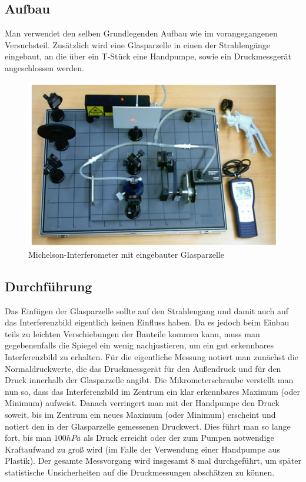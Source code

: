 \documentclass[a4paper, 11pt]{article}
\begin{document}
\subsection{Aufbau}
Man verwendet den selben Grundlegenden Aufbau wie im vorangegangenen Versuchsteil. Zusätzlich wird eine Glasparzelle in einen der Strahlengänge eingebaut, an die über ein T-Stück eine Handpumpe, sowie ein Druckmessgerät angeschlossen werden.

\begin{figure}[H]
	\centering
	\includegraphics[scale=0.5]{./Bilder/Aufbau_Bild_Luft.png}
	\caption{Michelson-Interferometer mit eingebauter Glasparzelle}
	\label{pic:Aufbau_Bild_Luft}	
\end{figure}

\subsection{Durchführung}
Das Einfügen der Glasparzelle sollte auf den Strahlengang und damit auch auf das Interferenzbild eigentlich keinen Einfluss haben. Da es jedoch beim Einbau teils zu leichten Verschiebungen der Bauteile kommen kann, muss man gegebenenfalls die Spiegel ein wenig nachjustieren, um ein gut erkennbares Interferenzbild zu erhalten. \newline
Für die eigentliche Messung notiert man zunächst die Normaldruckwerte, die das Druckmessgerät für den Außendruck und für den Druck innerhalb der Glasparzelle angibt. 
Die Mikrometerschraube verstellt man nun so, dass das Interferenzbild im Zentrum ein klar erkennbares Maximum (oder Minimum) aufweist.
Danach verringert man mit der Handpumpe den Druck soweit, bis im Zentrum ein neues Maximum (oder Minimum) erscheint und notiert den in der Glasparzelle gemessenen Druckwert. Dies führt man so lange fort, bis man $ 100 hPa$ als Druck erreicht oder der zum Pumpen notwendige Kraftaufwand zu groß wird (im Falle der Verwendung einer Handpumpe aus  Plastik). \newline
Der gesamte Messvorgang wird insgesamt 8 mal durchgeführt, um später statistische Unsicherheiten auf die Druckmessungen abschätzen zu können.
\end{document}
